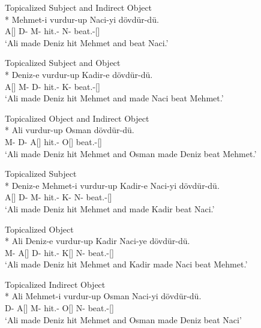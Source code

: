 \begin{exe}
\ex \label{ipextensive}
\begin{xlist}
\ex Topicalized Subject and Indirect Object\\*
 Mehmet-i vurdur-up Naci-yi dövdür-dü. \\ 
A[{\Nom}] D-{\Dat} M-{\Acc} hit.{\Caus}-{\Pc} N-{\Acc} beat.{\Caus}-{\Pst}[{\Tsg}] \\
\glt `Ali made Deniz hit Mehmet and beat Naci.'

\ex Topicalized Subject and Object\\*
 Deniz-e vurdur-up Kadir-e dövdür-dü. \\ 
A[{\Nom}] M-{\Acc} D-{\Dat} hit.{\Caus}-{\Pc} K-{\Dat} beat.{\Caus}-{\Pst}[{\Tsg}] \\
\glt `Ali made Deniz hit Mehmet and made Naci beat Mehmet.'

\ex Topicalized Object and Indirect Object\\*
 Ali vurdur-up Osman dövdür-dü. \\ 
M-{\Acc} D-{\Dat} A[{\Nom}] hit.{\Caus}-{\Pc} O[{\Nom}] beat.{\Caus}-{\Pst}[{\Tsg}] \\
\glt `Ali made Deniz hit Mehmet and Osman made Deniz beat Mehmet.'

\ex Topicalized Subject \label{iptops}\\*
\gll [Ali] Deniz-e Mehmet-i vurdur-up Kadir-e Naci-yi dövdür-dü. \\ 
A[{\Nom}] D-{\Dat} M-{\Acc} hit.{\Caus}-{\Pc} K-{\Dat} N-{\Acc} beat.{\Caus}-{\Pst}[{\Tsg}] \\
\glt `Ali made Deniz hit Mehmet and made Kadir beat Naci.'

\ex Topicalized Object\\*
\gll [Mehmet-i] Ali Deniz-e vurdur-up Kadir Naci-ye dövdür-dü. \\ 
M-{\Acc} A[{\Nom}] D-{\Dat} hit.{\Caus}-{\Pc} K[{\Nom}] N-{\Dat} beat.{\Caus}-{\Pst}[{\Tsg}] \\
\glt `Ali made Deniz hit Mehmet and Kadir made Naci beat Mehmet.' 

\ex Topicalized Indirect Object\\*
\gll [Deniz-e] Ali Mehmet-i vurdur-up Osman Naci-yi dövdür-dü. \\ 
D-{\Dat} A[{\Nom}] M-{\Acc} hit.{\Caus}-{\Pc} O[{\Nom}] N-{\Acc} beat.{\Caus}-{\Pst}[{\Tsg}] \\
\glt`Ali made Deniz hit Mehmet and Osman made Deniz beat Naci'
\end{xlist}
\end{exe}

